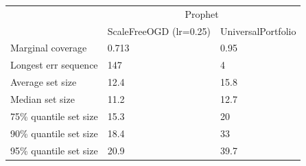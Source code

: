\begin{tabular}{lll}
\toprule
& \multicolumn{2}{c}{Prophet} \\
& ScaleFreeOGD (lr=0.25) & UniversalPortfolio \\
\midrule
Marginal coverage & 0.713 & 0.95 \\
Longest err sequence & 147 & 4 \\
Average set size & 12.4 & 15.8 \\
Median set size & 11.2 & 12.7 \\
75\% quantile set size & 15.3 & 20 \\
90\% quantile set size & 18.4 & 33 \\
95\% quantile set size & 20.9 & 39.7 \\
\bottomrule
\end{tabular}
